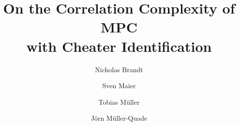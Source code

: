 \documentclass[18pt]{beamer}
\title{On the Correlation Complexity of MPC\\with Cheater Identification}
\author{\vspace*{-1cm}}
\institute{\vspace*{-1cm}}
\author{
        Nicholas Brandt\inst{1}
        \and
        Sven Maier\inst{2}
        \and
        Tobias Müller\inst{3}
        \and
        Jörn Müller-Quade\inst{4}
        \phantom{\thanks{
            Work done while the first author was supported by ERC Project PREP-CRYPTO 724307,
            the second author was at the Karlsruhe Institute of Technology, Germany,
            and the third author was at the FZI Research Center for Information Technology, Germany.
        }}
    }
\institute{
        ETH Zurich, Zurich, Switzerland,
        \email{nicholas.brandt@inf.ethz.ch}
        \and
        CNRS, IRIF, Université de Paris, France,
        \email{sven.maier@irif.fr}
        \and
        \email{muellertobias@outlook.de}
        \and
        Karlsruhe Institute of Technology, Germany,
        \email{joern.mueller-quade@kit.edu}
    }
\begin{document}

\vspace*{-1cm}
\begin{frame}
	\titlepage
\end{frame}


\printbibliography
\end{document}
